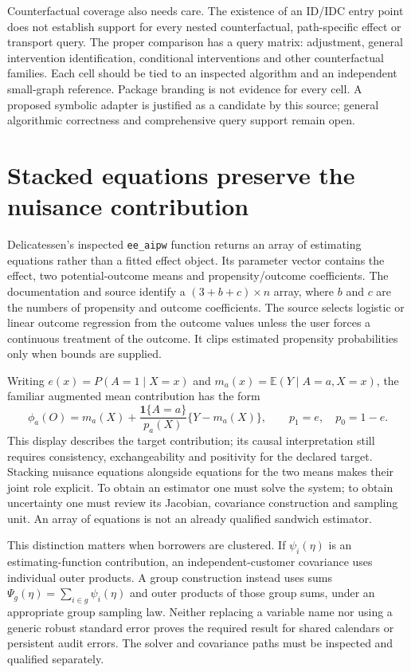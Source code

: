 Counterfactual coverage also needs care. The existence of an ID/IDC entry point
does not establish support for every nested counterfactual, path-specific effect
or transport query. The proper comparison has a query matrix: adjustment,
general intervention identification, conditional interventions and other
counterfactual families. Each cell should be tied to an inspected algorithm and
an independent small-graph reference. Package branding is not evidence for every
cell. A proposed symbolic adapter is justified as a candidate by this source;
general algorithmic correctness and comprehensive query support remain open.

\section{Stacked equations preserve the nuisance contribution}

Delicatessen's inspected \texttt{ee\_aipw} function returns an array of estimating
equations rather than a fitted effect object. Its parameter vector contains the
effect, two potential-outcome means and propensity/outcome coefficients. The
documentation and source identify a $(3+b+c)\times n$ array, where $b$ and $c$
are the numbers of propensity and outcome coefficients. The source selects
logistic or linear outcome regression from the outcome values unless the user
forces a continuous treatment of the outcome. It clips estimated propensity
probabilities only when bounds are supplied. \cite{v13_sw_delicatessen}

Writing $e(x)=P(A=1\mid X=x)$ and $m_a(x)=\mathbb E(Y\mid A=a,X=x)$, the
familiar augmented mean contribution has the form
\[
 \phi_a(O)=m_a(X)+\frac{\mathbf 1\{A=a\}}{p_a(X)}
                   \{Y-m_a(X)\},
 \qquad p_1=e,\quad p_0=1-e.
\]
This display describes the target contribution; its causal interpretation still
requires consistency, exchangeability and positivity for the declared target.
Stacking nuisance equations alongside equations for the two means makes their
joint role explicit. To obtain an estimator one must solve the system; to obtain
uncertainty one must review its Jacobian, covariance construction and sampling
unit. An array of equations is not an already qualified sandwich estimator.

This distinction matters when borrowers are clustered. If $\psi_i(\eta)$ is
an estimating-function contribution, an independent-customer covariance uses
individual outer products. A group construction instead uses sums
$\Psi_g(\eta)=\sum_{i\in g}\psi_i(\eta)$ and outer products of those group
sums, under an appropriate group sampling law. Neither replacing a variable
name nor using a generic robust standard error proves the required result for
shared calendars or persistent audit errors. The solver and covariance paths
must be inspected and qualified separately.

